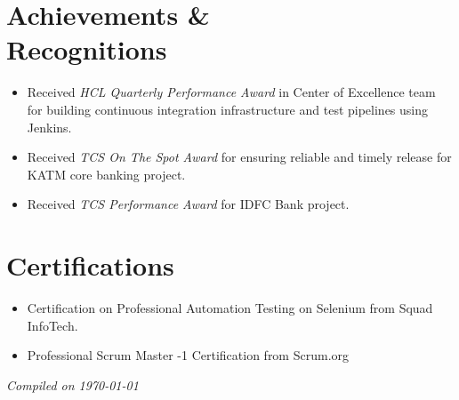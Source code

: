 \documentclass[margin,line]{resume}
\begin{document}
\begin{resume}
\section{\mysidestyle Achievements \& \\ Recognitions}\vspace{0mm}
    \begin{itemize}
             \item Received \textit{HCL Quarterly Performance Award} in Center of Excellence team for building continuous integration infrastructure and test pipelines using Jenkins.    
            \item Received \textit{TCS On The Spot Award} for ensuring reliable and timely release for KATM core banking project.
            \item Received \textit{TCS Performance Award} for IDFC Bank project.
    \end{itemize}
\vspace{1mm}
\section{\mysidestyle Certifications}
\vspace{0mm}
    \begin{itemize}
        \item Certification on Professional Automation Testing on Selenium from Squad InfoTech.
        \item Professional Scrum Master -1 Certification from Scrum.org
    \end{itemize}
\hfill \textsl{Compiled on \monthyeardate\today}
\end{resume}
\end{document}
